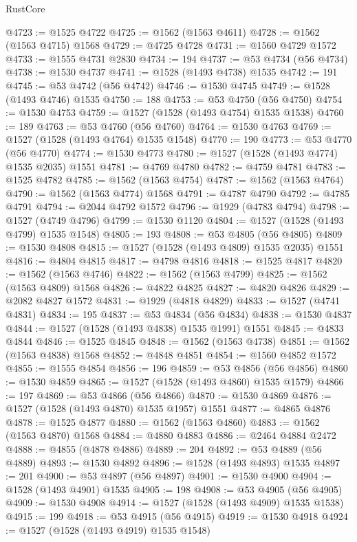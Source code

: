 \begin{lexlean}{RustCore}
\begin{coremodule}
@4723 := @1525 @4722
@4725 := @1562 (@1563 @4611)
@4728 := @1562 (@1563 @4715) @1568
@4729 := @4725 @4728
@4731 := @1560 @4729 @1572
@4733 := @1555 @4731 @2830
@4734 := 194
@4737 := @53 @4734 (@56 @4734)
@4738 := @1530 @4737
@4741 := @1528 (@1493 @4738) @1535
@4742 := 191
@4745 := @53 @4742 (@56 @4742)
@4746 := @1530 @4745
@4749 := @1528 (@1493 @4746) @1535
@4750 := 188
@4753 := @53 @4750 (@56 @4750)
@4754 := @1530 @4753
@4759 := @1527 (@1528 (@1493 @4754) @1535 @1538)
@4760 := 189
@4763 := @53 @4760 (@56 @4760)
@4764 := @1530 @4763
@4769 := @1527 (@1528 (@1493 @4764) @1535 @1548)
@4770 := 190
@4773 := @53 @4770 (@56 @4770)
@4774 := @1530 @4773
@4780 := @1527 (@1528 (@1493 @4774) @1535 @2035) @1551
@4781 := @4769 @4780
@4782 := @4759 @4781
@4783 := @1525 @4782
@4785 := @1562 (@1563 @4754)
@4787 := @1562 (@1563 @4764)
@4790 := @1562 (@1563 @4774) @1568
@4791 := @4787 @4790
@4792 := @4785 @4791
@4794 := @2044 @4792 @1572
@4796 := @1929 (@4783 @4794)
@4798 := @1527 (@4749 @4796)
@4799 := @1530 @1120
@4804 := @1527 (@1528 (@1493 @4799) @1535 @1548)
@4805 := 193
@4808 := @53 @4805 (@56 @4805)
@4809 := @1530 @4808
@4815 := @1527 (@1528 (@1493 @4809) @1535 @2035) @1551
@4816 := @4804 @4815
@4817 := @4798 @4816
@4818 := @1525 @4817
@4820 := @1562 (@1563 @4746)
@4822 := @1562 (@1563 @4799)
@4825 := @1562 (@1563 @4809) @1568
@4826 := @4822 @4825
@4827 := @4820 @4826
@4829 := @2082 @4827 @1572
@4831 := @1929 (@4818 @4829)
@4833 := @1527 (@4741 @4831)
@4834 := 195
@4837 := @53 @4834 (@56 @4834)
@4838 := @1530 @4837
@4844 := @1527 (@1528 (@1493 @4838) @1535 @1991) @1551
@4845 := @4833 @4844
@4846 := @1525 @4845
@4848 := @1562 (@1563 @4738)
@4851 := @1562 (@1563 @4838) @1568
@4852 := @4848 @4851
@4854 := @1560 @4852 @1572
@4855 := @1555 @4854
@4856 := 196
@4859 := @53 @4856 (@56 @4856)
@4860 := @1530 @4859
@4865 := @1527 (@1528 (@1493 @4860) @1535 @1579)
@4866 := 197
@4869 := @53 @4866 (@56 @4866)
@4870 := @1530 @4869
@4876 := @1527 (@1528 (@1493 @4870) @1535 @1957) @1551
@4877 := @4865 @4876
@4878 := @1525 @4877
@4880 := @1562 (@1563 @4860)
@4883 := @1562 (@1563 @4870) @1568
@4884 := @4880 @4883
@4886 := @2464 @4884 @2472
@4888 := @4855 (@4878 @4886)
@4889 := 204
@4892 := @53 @4889 (@56 @4889)
@4893 := @1530 @4892
@4896 := @1528 (@1493 @4893) @1535
@4897 := 201
@4900 := @53 @4897 (@56 @4897)
@4901 := @1530 @4900
@4904 := @1528 (@1493 @4901) @1535
@4905 := 198
@4908 := @53 @4905 (@56 @4905)
@4909 := @1530 @4908
@4914 := @1527 (@1528 (@1493 @4909) @1535 @1538)
@4915 := 199
@4918 := @53 @4915 (@56 @4915)
@4919 := @1530 @4918
@4924 := @1527 (@1528 (@1493 @4919) @1535 @1548)

\end{coremodule}
\end{lexlean}
